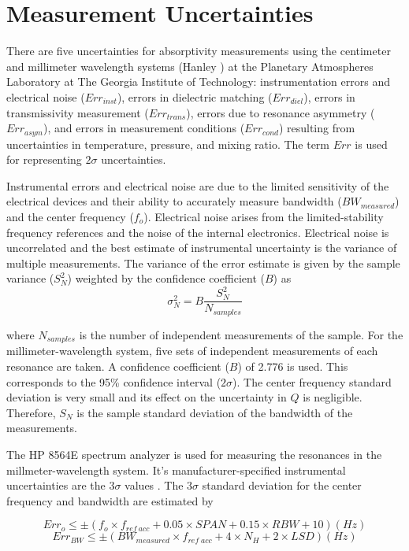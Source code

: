 \section{Measurement Uncertainties}

There are five uncertainties for absorptivity measurements using the  centimeter and millimeter wavelength systems (Hanley \cite{Hanley-thesis}) at the Planetary Atmospheres Laboratory at The Georgia Institute of Technology: instrumentation errors and electrical noise ($Err_{inst}$), errors in dielectric matching ($Err_{diel}$), errors in transmissivity measurement ($Err_{trans}$), errors due to resonance asymmetry ($Err_{asym}$), and errors in measurement conditions ($Err_{cond}$) resulting from uncertainties in temperature, pressure, and mixing ratio. The term $Err$ is used for representing $2\sigma$ uncertainties.

Instrumental errors and electrical noise are due to the limited sensitivity of the electrical devices and their ability to accurately measure bandwidth ($BW_{measured}$) and the center frequency ($f_o$). Electrical noise arises from the limited-stability frequency references and the noise of the internal electronics. Electrical noise is uncorrelated and the best estimate of instrumental uncertainty is the variance of multiple measurements. The variance of the error estimate is given by the sample variance ($S^2_N$) weighted by the confidence coefficient ($B$) as
\begin{equation}\label{eq:sigman}
\sigma^2_N = B \frac{S^2_N}{N_{samples}}
\end{equation}

\noindent where $N_{samples}$ is the number of independent measurements of the sample. For the millimeter-wavelength system, five sets of independent measurements of each resonance are taken. A confidence coefficient ($B$) of 2.776 is used. This corresponds to the 95\% confidence interval ($2\sigma$). The center frequency standard deviation is very small and its effect on the uncertainty in $Q$ is negligible. Therefore, $S_N$ is the sample standard deviation of the bandwidth of the measurements.

The HP 8564E spectrum analyzer is used for measuring the resonances in the millmeter-wavelength system. It's manufacturer-specified instrumental uncertainties are the $3\sigma$ values \cite{Hewlett-Packard}. The $3\sigma$ standard deviation for the center frequency and bandwidth are estimated by 

\begin{equation}\label{eq:sigmao}
Err_o \leq \pm (f_o \times f_{ref\:acc} + 0.05 \times SPAN + 0.15 \times RBW +10 ) (Hz)
\end{equation}
\begin{equation}\label{eq:sigmabw}
Err_{BW} \leq \pm (BW_{measured} \times f_{ref\;acc} + 4 \times N_H +2 \times LSD ) (Hz)
\end{equation}

